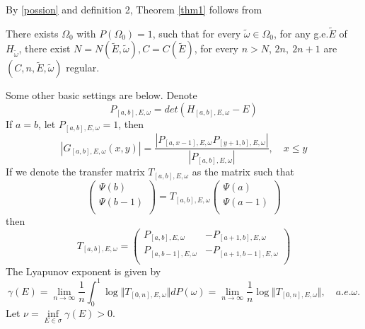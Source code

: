 By \eqref{possion} and definition 2, Theorem  \ref{thm1} follows from
\begin{thm}\label{thm2}
  There exists $ \Omega_0$ with $P(\Omega_0)=1$, such that for every $ \tilde{\omega}\in\Omega_0$, for any g.e.$\tilde{E}$ of $H_{\tilde{\omega}}$, there exist $ N=N(\tilde{E},\tilde{\omega}),C=C(\tilde{E})$, for every $ n>N$, $2n,~2n+1$ are $(C,n,\tilde{E},\tilde{\omega})$ regular.
\end{thm}

Some other basic settings are below. Denote
\[
  P_{[a,b],E,\omega}=det(H_{[a,b],E,\omega}-E)
\]
If $a=b$, let $  P_{[a,b],E,\omega}=1$, then
\begin{equation}\label{A}
  \left\vert G_{[a,b],E,\omega}(x,y)\right\vert=\frac{\left\vert P_{[a,x-1],E,\omega}P_{[y+1,b],E,\omega}\right\vert}{\left\vert P_{[a,b],E,\omega}\right\vert},\quad x\leq y
\end{equation}
If we denote the transfer matrix $T_{[a,b],E,\omega}$ as the matrix such that
\[
\left(
\begin{array}{c}
  \Psi(b)\\
  \Psi(b-1)\\
\end{array}
\right)
=T_{[a,b],E,\omega} \left(
\begin{array}{c}
  \Psi(a)\\
  \Psi(a-1)\\
\end{array}
\right)
\]
then
\[
T_{[a,b],E,\omega}=\left(
  \begin{array}{cc}
    P_{[a,b],E,\omega} & -P_{[a+1,b],E,\omega}\\
    P_{[a,b-1],E,\omega} & -P_{[a+1,b-1],E,\omega}\\
  \end{array}
  \right)
\]
The Lyapunov exponent is given by
  \[
    \gamma(E)=\lim_{n\to\infty}\frac{1}{n}\int_0^1 \log\Vert T_{[0,n],E,\omega}\Vert dP(\omega)=\lim_{n\rightarrow\infty}\frac{1}{n} \log\Vert T_{[0,n],E,\omega}\Vert, \quad a.e.\omega.
  \]
Let $\nu=\inf\limits_{E\in \sigma}\gamma(E)>0$.

